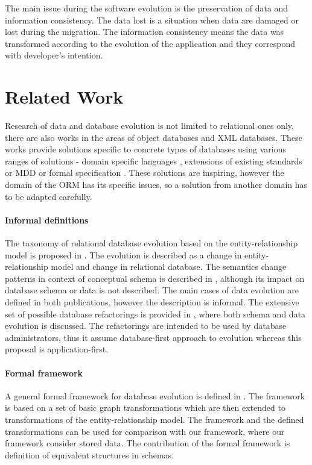\documentclass[11pt]{article}
\begin{document}
The main issue during the software evolution is the preservation of data and information consistency. The data lost is a situation when data are damaged or lost during the migration. The information consistency means the data was transformed according to the evolution of the application and they correspond with developer's intention. 


\section{Related Work}
\label{sec:related-work}
Research of data and database evolution is not limited to relational ones only, there are also works in the areas of object databases and XML databases. These works provide solutions specific to concrete types of databases using various ranges of solutions - domain specific languages \cite{SERF}, extensions of existing standards or MDD \cite{Evolution_vs_Reorganization} or formal specification \cite{Tresch:1991vi}. These solutions are inspiring, however the domain of the ORM has its specific issues, so a solution from another domain has to be adapted carefully.

\paragraph{Informal definitions} The taxonomy of relational database evolution based on the entity-relationship model  is proposed in \cite{Roddick:TaxonomyOnERM}. The evolution is described as a change in entity-relationship model and change in relational database.  The semantics change patterns in context of conceptual schema is described in \cite{Wedemeijer:SemanticChangePatternsInConceptualSchema}, although its impact on database schema or data is not described. The main cases of data evolution are defined in both publications, however the description is informal. The extensive set of possible database refactorings is provided in \cite{Ambler:DbRefactoringBook}, where both schema and data evolution is discussed. The refactorings are intended to be used by database administrators, thus it assume database-first approach to evolution whereas this proposal is application-first.   

\paragraph{Formal framework} A general formal framework for database evolution is defined in \cite{McBrien:formal-framework-transformation}. The framework is based on a set of basic graph transformations which are then extended to transformations of the entity-relationship model. The framework and the defined transformations can be used for comparison with our framework, where our framework consider stored data. The contribution of the formal framework is definition of equivalent structures in schemas.
\end{document}
